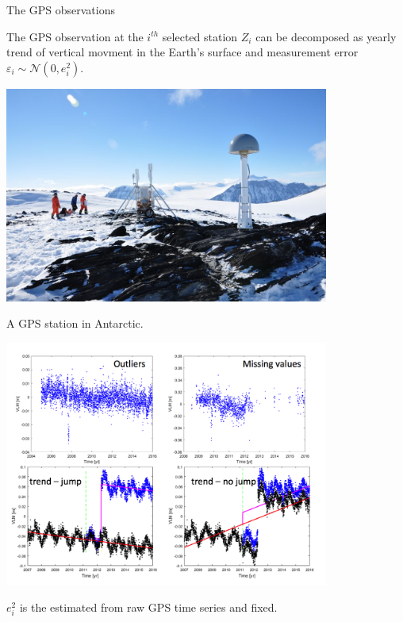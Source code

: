 \documentclass{beamer}
\begin{document}
\begin{frame}{The GPS observations}

The GPS observation at the $i^{th}$ selected station $Z_i$ can be decomposed as yearly trend of vertical movment in the Earth's surface and measurement error $\varepsilon_i \sim \mathcal{N}(0, e_i^2) $.

\begin{minipage}[c]{0.4\textwidth}
\centering
\includegraphics[width=0.8\textwidth]{images/GPSstation}

\tiny{A GPS station in Antarctic.}
\end{minipage}%
\hfill
\begin{minipage}[c]{0.6\textwidth}
\centering
\includegraphics[width=0.8\textwidth]{images/GPSts}
\end{minipage}

$e_i^2$  is the estimated from raw GPS time series and fixed. 
\end{frame}
\end{document}

